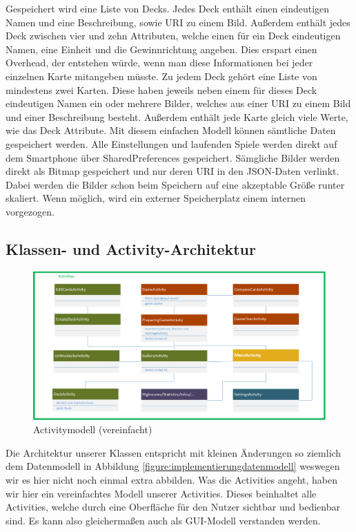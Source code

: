 Gespeichert wird eine Liste von Decks. Jedes Deck enthält einen eindeutigen Namen und eine Beschreibung, sowie URI zu einem Bild. Außerdem enthält jedes Deck zwischen vier und zehn Attributen, welche einen für ein Deck eindeutigen Namen, eine Einheit und die Gewinnrichtung angeben. Dies erspart einen Overhead, der entstehen würde, wenn man diese Informationen bei jeder einzelnen Karte mitangeben müsste. Zu jedem Deck gehört eine Liste von mindestens zwei Karten. Diese haben jeweils neben einem für dieses Deck eindeutigen Namen ein oder mehrere Bilder, welches aus einer URI zu einem Bild und einer Beschreibung besteht. Außerdem enthält jede Karte gleich viele Werte, wie das Deck Attribute. Mit diesem einfachen Modell können sämtliche Daten gespeichert werden. Alle Einstellungen und laufenden Spiele werden direkt auf dem Smartphone über SharedPreferences gespeichert. Sämgliche Bilder werden direkt als Bitmap gespeichert und nur deren URI in den JSON-Daten verlinkt. Dabei werden die Bilder schon beim Speichern auf eine akzeptable Größe runter skaliert. Wenn möglich, wird ein externer Speicherplatz einem internen vorgezogen.

\subsection{Klassen- und Activity-Architektur}
\label{sec:implementierung:architektur:klassenmodell }

\begin{figure}[htp]
	\centering
  	\includegraphics[width=\textwidth]{img/modelle/Klassenmodell_Activities.png}
	\caption{Activitymodell (vereinfacht)}
	\label{figure:implementierungactivitymodell}
\end{figure}

Die Architektur unserer Klassen entspricht mit kleinen Änderungen so ziemlich dem Datenmodell in Abbildung \ref{figure:implementierungdatenmodell} weswegen wir es hier nicht noch einmal extra abbilden. Was die Activities angeht, haben wir hier ein vereinfachtes Modell unserer Activities. Dieses beinhaltet alle Activities, welche durch eine Oberfläche für den Nutzer sichtbar und bedienbar sind. Es kann also gleichermaßen auch als GUI-Modell verstanden werden.

